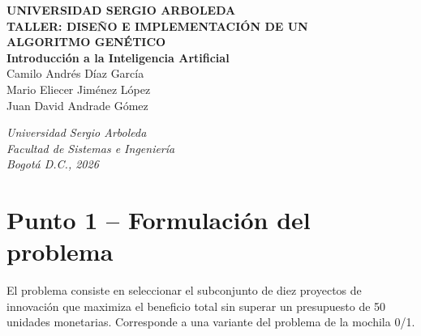 \documentclass[12pt,a4paper]{article}
\begin{document}
\begin{titlepage}
\thispagestyle{empty}
\centering

\vspace*{1.5cm}

{\fontsize{13}{15}\selectfont\textbf{UNIVERSIDAD SERGIO ARBOLEDA}}\\[2.5cm]

{\fontsize{14}{17}\selectfont\textbf{TALLER: DISE\~{N}O E IMPLEMENTACI\'{O}N DE UN\\
ALGORITMO GEN\'{E}TICO}}\\[3.5cm]

{\fontsize{12}{14}\selectfont\textbf{Introducci\'{o}n a la Inteligencia Artificial}}\\[1.8cm]

{\fontsize{12}{14}\selectfont
Camilo Andr\'{e}s D\'{i}az Garc\'{i}a\\
Mario Eliecer Jim\'{e}nez L\'{o}pez\\
Juan David Andrade G\'{o}mez}\\[0.3cm]

\vfill

\begin{center}
    \textit{Universidad Sergio Arboleda}\\
    \textit{Facultad de Sistemas e Ingenier\'{i}a}\\
    \textit{Bogot\'{a} D.C., 2026}
\end{center}

\end{titlepage}

\newpage
\tableofcontents
\newpage

\section{Punto 1 -- Formulaci\'{o}n del problema}

El problema consiste en seleccionar el subconjunto de diez proyectos
de innovaci\'{o}n que maximiza el beneficio total sin superar un
presupuesto de 50 unidades monetarias. Corresponde a una variante
del problema de la mochila 0/1.
\end{document}
